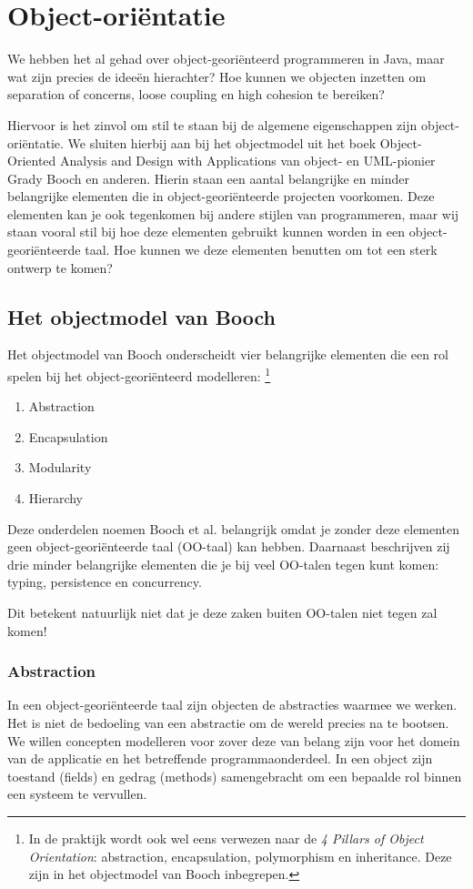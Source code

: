 \chapter{Object-oriëntatie}
We hebben het al gehad over object-georiënteerd programmeren
in Java, maar wat zijn precies de ideeën hierachter?
Hoe kunnen we objecten inzetten om separation of concerns,
loose coupling en high cohesion te bereiken?

Hiervoor is het zinvol om stil te staan bij de algemene eigenschappen 
zijn object-oriëntatie. We sluiten hierbij aan 
bij het objectmodel uit het boek 
Object-Oriented Analysis and Design with Applications 
van object- en UML-pionier Grady Booch en anderen. 
Hierin staan een aantal belangrijke en minder belangrijke 
elementen die in object-georiënteerde projecten voorkomen. 
Deze elementen kan je ook tegenkomen bij andere stijlen van programmeren,
maar wij staan vooral stil bij hoe deze elementen gebruikt kunnen worden 
in een object-georiënteerde taal. Hoe kunnen we deze elementen benutten 
om tot een sterk ontwerp te komen?

\section{Het objectmodel van Booch}
Het objectmodel van Booch onderscheidt vier belangrijke elementen 
die een rol spelen bij het object-georiënteerd modelleren:
\footnote{
    In de praktijk wordt ook wel eens verwezen naar de \textit{4 Pillars of Object Orientation}: 
    abstraction, encapsulation, polymorphism en inheritance. 
    Deze zijn in het objectmodel van Booch inbegrepen.
}
\begin{enumerate}
    \item Abstraction
    \item Encapsulation 
    \item Modularity 
    \item Hierarchy
\end{enumerate}

Deze onderdelen noemen Booch et al. belangrijk omdat je 
zonder deze elementen geen object-georiënteerde taal (OO-taal) kan hebben.
Daarnaast beschrijven zij drie minder belangrijke elementen die je 
bij veel OO-talen tegen kunt komen: typing, persistence en concurrency.

Dit betekent natuurlijk niet dat je deze zaken buiten OO-talen niet tegen zal komen! 

\subsection{Abstraction}
In een object-georiënteerde taal zijn objecten de abstracties 
waarmee we werken. Het is niet de bedoeling van een abstractie 
om de wereld precies na te bootsen.
We willen concepten modelleren voor zover deze van belang zijn 
voor het domein van de applicatie en het betreffende programmaonderdeel.
In een object zijn toestand (fields) en gedrag (methods) samengebracht
om een bepaalde rol binnen een systeem te vervullen.

